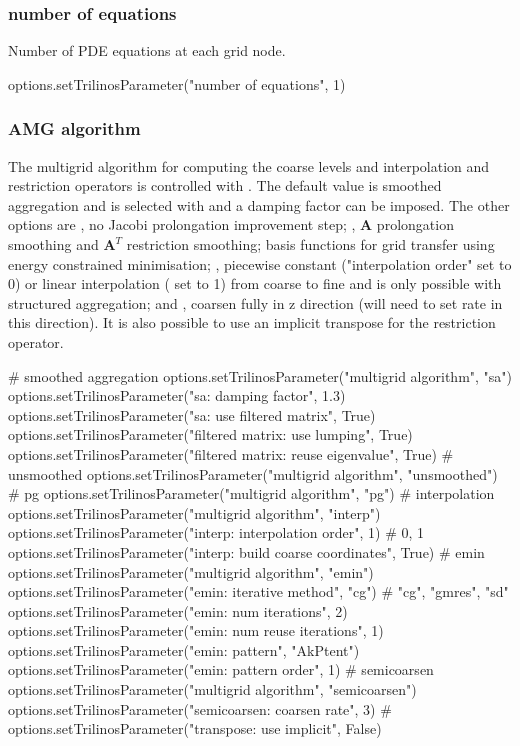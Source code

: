 \subsubsection{number of equations}
Number of PDE equations at each grid node.
\begin{python}
options.setTrilinosParameter("number of equations", 1)        
\end{python}

\subsubsection{AMG algorithm}
The multigrid algorithm for computing the coarse levels and interpolation and restriction operators is controlled with . The default value is smoothed aggregation and is selected with  and a damping factor can be imposed.  The other options are , no Jacobi prolongation improvement step; , $\mathbf{A}$ prolongation smoothing and $\mathbf{A}^T$ restriction smoothing;  basis functions for grid transfer using energy constrained minimisation; , piecewise constant ("interpolation order" set to 0) or linear interpolation ( set to 1) from coarse to fine and is only possible with structured aggregation; and , coarsen fully in z direction (will need to set rate in this direction).   It is also possible to use an implicit transpose for the restriction operator.
\begin{python}
# smoothed aggregation
options.setTrilinosParameter("multigrid algorithm", "sa")
options.setTrilinosParameter("sa: damping factor", 1.3)
options.setTrilinosParameter("sa: use filtered matrix", True)
options.setTrilinosParameter("filtered matrix: use lumping", True)
options.setTrilinosParameter("filtered matrix: reuse eigenvalue", True)
# unsmoothed
options.setTrilinosParameter("multigrid algorithm", "unsmoothed")
# pg
options.setTrilinosParameter("multigrid algorithm", "pg")
# interpolation
options.setTrilinosParameter("multigrid algorithm", "interp")
options.setTrilinosParameter("interp: interpolation order", 1)    
                                                          # 0, 1
options.setTrilinosParameter("interp: build coarse coordinates", True)
# emin
options.setTrilinosParameter("multigrid algorithm", "emin")
options.setTrilinosParameter("emin: iterative method", "cg") 
                                                     # "cg", "gmres", "sd"
options.setTrilinosParameter("emin: num iterations", 2)
options.setTrilinosParameter("emin: num reuse iterations", 1)
options.setTrilinosParameter("emin: pattern", "AkPtent")
options.setTrilinosParameter("emin: pattern order", 1)
# semicoarsen
options.setTrilinosParameter("multigrid algorithm", "semicoarsen")
options.setTrilinosParameter("semicoarsen: coarsen rate", 3)
#
options.setTrilinosParameter("transpose: use implicit", False) 
\end{python}

